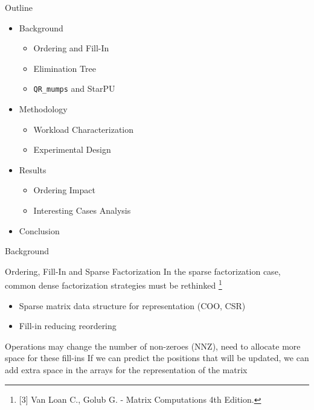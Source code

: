 \documentclass[presentation]{beamer}
\begin{document}
\begin{frame}[fragile,label={sec:orge350978}]{Outline}
 \vfill
\Large
\begin{itemize}
\item Background
\begin{itemize}
\item Ordering and Fill-In
\item Elimination Tree
\item \texttt{QR\_mumps} and StarPU
\end{itemize}
\end{itemize}
\vfill
\begin{itemize}
\item Methodology
\begin{itemize}
\item Workload Characterization
\item Experimental Design
\end{itemize}
\end{itemize}
\vfill
\begin{itemize}
\item Results
\begin{itemize}
\item Ordering Impact
\item Interesting Cases Analysis
\end{itemize}
\end{itemize}
\vfill
\begin{itemize}
\item Conclusion
\end{itemize}
\begin{block}{}
\begin{center}
\Huge{Background}
\end{center}
\end{block}
\end{frame}
\begin{frame}[label={sec:org61a82f6}]{Ordering, Fill-In and Sparse Factorization}
\vfill
In the sparse factorization case, common dense factorization
strategies must be rethinked \footnote{[3] Van Loan C., Golub G. - Matrix Computations 4th Edition.} 
\vfill
\begin{itemize}
\item Sparse matrix \alert{data structure} for representation (COO, CSR)
\item \alert{Fill-in} reducing reordering
\end{itemize}
\vfill \pause
Operations may change the number of non-zeroes (NNZ), need to allocate
more space for these fill-ins
\vfill \pause
If we can \alert{predict} the positions that will be updated, we can add extra
space in the arrays for the representation of the matrix 
\end{frame}
\end{document}
